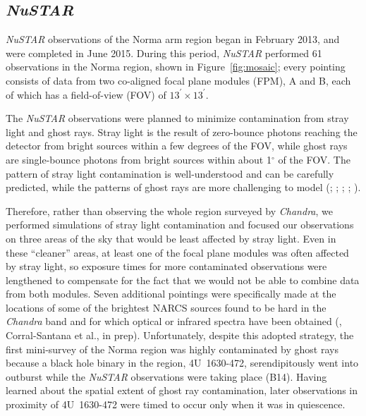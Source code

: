 \documentclass[iop,revtex4]{emulateapj}
\begin{document}
\subsection{\textit{NuSTAR}}
\textit{NuSTAR} observations of the Norma arm region began in February 2013, and were completed in June 2015.  During this period, \textit{NuSTAR} performed 61 observations in the Norma region, shown in Figure~\ref{fig:mosaic}; every pointing consists of data from two co-aligned focal plane modules (FPM), A and B, each of which has a field-of-view (FOV) of $13^{\prime}\times13^{\prime}$.  \par
The \textit{NuSTAR} observations were planned to minimize contamination from stray light and ghost rays.  Stray light is the result of zero-bounce photons reaching the detector from bright sources within a few degrees of the FOV, while ghost rays are single-bounce photons from bright sources within about 1$^{\circ}$ of the FOV.  The pattern of stray light contamination is well-understood and can be carefully predicted\footnotemark{}, while the patterns of ghost rays are more challenging to model (\citealt{koglin11}; \citealt{harrison13}; \citealt{wik14}; \citealt{mori15}; \citealt{madsen15}).  \par
Therefore, rather than observing the whole region surveyed by \textit{Chandra}, we performed simulations of stray light contamination and focused our observations on three areas of the sky that would be least affected by stray light.  Even in these ``cleaner'' areas, at least one of the focal plane modules was often affected by stray light, so exposure times for more contaminated observations were lengthened to compensate for the fact that we would not be able to combine data from both modules.  Seven additional pointings were specifically made at the locations of some of the brightest NARCS sources found to be hard in the \textit{Chandra} band and for which optical or infrared spectra have been obtained (\citealt{rahoui14}, Corral-Santana et al., in prep).  Unfortunately, despite this adopted strategy, the first mini-survey of the Norma region was highly contaminated by ghost rays because a black hole binary in the region, 4U~1630-472, serendipitously went into outburst while the \textit{NuSTAR} observations were taking place (B14).  Having learned about the spatial extent of ghost ray contamination, later observations in proximity of 4U~1630-472 were timed to occur only when it was in quiescence.  \par
\end{document}
